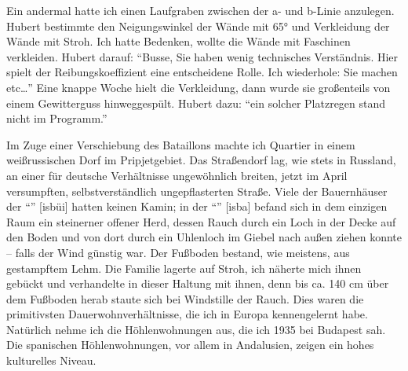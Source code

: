 Ein andermal hatte ich einen Laufgraben zwischen der a- und b-Linie anzulegen. Hubert bestimmte den Neigungswinkel der Wände mit 65° und Verkleidung der Wände mit Stroh. Ich hatte Bedenken, wollte die Wände mit Faschinen verkleiden. Hubert darauf: \enquote{Busse, Sie haben wenig technisches Verständnis. Hier spielt der Reibungskoeffizient eine entscheidene Rolle. Ich wiederhole: Sie machen etc\dots} Eine knappe Woche hielt die Verkleidung, dann wurde sie großenteils von einem Gewitterguss hinweggespült. Hubert dazu: \enquote{ein solcher Platzregen stand nicht im Programm.}

Im Zuge einer Verschiebung des Bataillons machte ich Quartier in einem weißrussischen Dorf im Pripjetgebiet. Das Straßendorf lag, wie stets in Russland, an einer für deutsche Verhältnisse ungewöhnlich breiten, jetzt im April versumpften, selbstverständlich ungepflasterten Straße. Viele der Bauernhäuser der \enquote{} [isbüi] hatten keinen Kamin; in der \enquote{} [isba] befand sich in dem einzigen Raum ein steinerner offener Herd, dessen Rauch durch ein Loch in der Decke auf den Boden und von dort durch ein Uhlenloch im Giebel nach außen ziehen konnte -- falls der Wind günstig war. Der Fußboden bestand, wie meistens, aus gestampftem Lehm. Die Familie lagerte auf Stroh, ich näherte mich ihnen gebückt und verhandelte in dieser Haltung mit ihnen, denn bis ca. 140 cm über dem Fußboden herab staute sich bei Windstille der Rauch. Dies waren die primitivsten Dauerwohnverhältnisse, die ich in Europa kennengelernt habe. Natürlich nehme ich die Höhlenwohnungen aus, die ich 1935 bei Budapest sah. Die spanischen Höhlenwohnungen, vor allem in Andalusien, zeigen ein hohes kulturelles Niveau.


